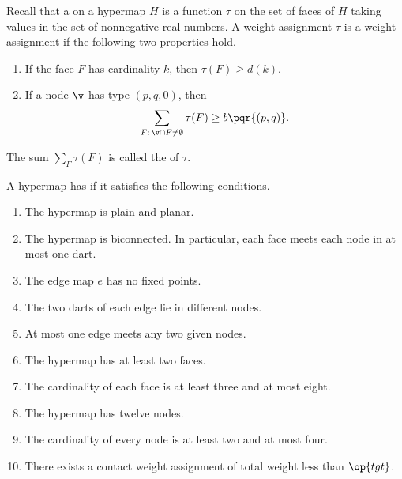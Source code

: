 %
%
\begin{definition}
%
  Recall that a  
on a hypermap $H$ is a
  function $\tau$ on the set of faces of $H$ taking values in the set
  of nonnegative real numbers. A weight assignment $\tau$
is a 
  weight assignment if the following two properties hold.
%
\begin{enumerate}
\item If the face $F$ has cardinality $k$, then
$\tau(F) \ge d(k)$.
\item If a node $\v$ has type $(p,q,0)$, then
  \[\sum_{F:\,\v\cap F\ne\emptyset} \tau(F) \ge
    b{\pqr{(p,q)}}.\]
\end{enumerate}
The sum $\sum_F \tau(F)$ is called the  of $\tau$.
\end{definition}
%

\begin{definition}
  A hypermap has  if it satisfies the following 
  conditions.
%
%
%
%
%
%
%
%
%
\begin{enumerate}
\item {} The hypermap is plain and planar.
\item {} The hypermap is biconnected.  In particular,
  each face meets each node in at most one dart.
\item {} The edge map $e$ has no fixed points.
\item {} The two darts of each edge lie in different
  nodes.
\item {} At most one edge meets any two given
  nodes.
\item {} The hypermap has at least two faces.
\item {} The cardinality of each face is at least three
  and at most eight.
\item {} The hypermap has twelve nodes.
\item {} The cardinality of every node is at least two  and at most four.
\item {} There exists a contact weight assignment of total
  weight less than $\op{tgt}$.
\end{enumerate}
%
\end{definition}



